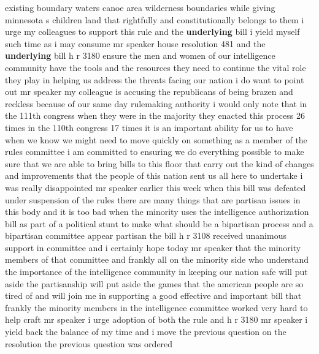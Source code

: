 \documentclass{article}
\begin{document}
existing boundary waters canoe area wilderness boundaries while giving minnesota s children land that rightfully and constitutionally belongs to them i urge my colleagues to support this rule and the {\bf \color{red} underlying} bill
\vspace{8mm}
i yield myself such time as i may consume mr speaker house resolution 481 and the {\bf \color{red} underlying} bill h r 3180 ensure the men and women of our intelligence community have the tools and the resources they need to continue the vital role they play in helping us address the threats facing our nation i do want to point out mr speaker my colleague is accusing the republicans of being brazen and reckless because of our same day rulemaking authority i would only note that in the 111th congress when they were in the majority they enacted this process 26 times in the 110th congress 17 times it is an important ability for us to have when we know we might need to move quickly on something as a member of the rules committee i am committed to ensuring we do everything possible to make sure that we are able to bring bills to this floor that carry out the kind of changes and improvements that the people of this nation sent us all here to undertake i was really disappointed mr speaker earlier this week when this bill was defeated under suspension of the rules there are many things that are partisan issues in this body and it is too bad when the minority uses the intelligence authorization bill as part of a political stunt to make what should be a bipartisan process and a bipartisan committee appear partisan the bill h r 3108 received unanimous support in committee and i certainly hope today mr speaker that the minority members of that committee and frankly all on the minority side who understand the importance of the intelligence community in keeping our nation safe will put aside the partisanship will put aside the games that the american people are so tired of and will join me in supporting a good effective and important bill that frankly the minority members in the intelligence committee worked very hard to help craft mr speaker i urge adoption of both the rule and h r 3180 mr speaker i yield back the balance of my time and i move the previous question on the resolution the previous question was ordered
\vspace{8mm}
\end{document}
